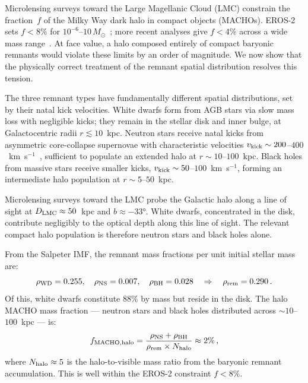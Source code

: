\documentclass[aps,prd,twocolumn,superscriptaddress,nofootinbib,longbibliography]{revtex4-2}
\begin{document}
Microlensing surveys toward the Large Magellanic Cloud (LMC) constrain
the fraction~$f$ of the Milky Way dark halo in compact objects
(MACHOs).  EROS-2 sets $f < 8\%$ for
$10^{-6}$--$10\,M_\odot$~\cite{Tisserand2007}; more recent analyses
give $f < 4\%$ across a wide mass range~\cite{Mroz2024,Alcock2000}.  At face
value, a halo composed entirely of compact baryonic remnants would
violate these limits by an order of magnitude.  We now show that the
physically correct treatment of the remnant spatial distribution
resolves this tension.

The three remnant types have fundamentally different spatial
distributions, set by their natal kick velocities.  White dwarfs form
from AGB stars via slow mass loss with negligible kicks; they remain in
the stellar disk and inner bulge, at Galactocentric radii
$r \lesssim 10$~kpc.  Neutron stars receive natal kicks from
asymmetric core-collapse supernovae with characteristic velocities
$v_{\rm kick} \sim 200$--$400$~km~s$^{-1}$~\cite{Hobbs2005},
sufficient to populate an extended halo at $r \sim 10$--$100$~kpc.
Black holes from massive stars receive smaller kicks,
$v_{\rm kick} \sim 50$--$100$~km~s$^{-1}$, forming an intermediate
halo population at $r \sim 5$--$50$~kpc.

Microlensing surveys toward the LMC probe the Galactic halo along a
line of sight at $D_{\rm LMC} \approx 50$~kpc and $b \approx -33°$.
White dwarfs, concentrated in the disk, contribute negligibly to the
optical depth along this line of sight.  The relevant compact halo
population is therefore neutron stars and black holes alone.

From the Salpeter IMF, the remnant mass fractions per unit initial
stellar mass are:
\begin{equation}\label{eq:remnant-fractions}
  \rho_{\rm WD} = 0.255,\quad \rho_{\rm NS} = 0.007,\quad
  \rho_{\rm BH} = 0.028 \quad\Rightarrow\quad \rho_{\rm rem} = 0.290\,.
\end{equation}
Of this, white dwarfs constitute $88\%$ by mass but reside in the
disk.  The halo MACHO mass fraction --- neutron stars and black holes
distributed across $\sim 10$--$100$~kpc --- is:
\begin{equation}\label{eq:fmacho}
  f_{\rm MACHO,halo} = \frac{\rho_{\rm NS} + \rho_{\rm BH}}
    {\rho_{\rm rem} \times N_{\rm halo}} \approx 2\%\,,
\end{equation}
where $N_{\rm halo} \approx 5$ is the halo-to-visible mass ratio from
the baryonic remnant accumulation.  This is well within the EROS-2
constraint $f < 8\%$.
\end{document}
